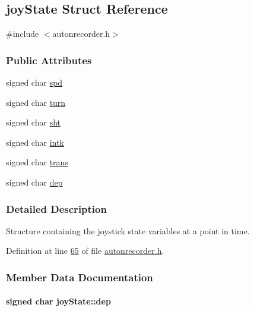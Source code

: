 \hypertarget{structjoy_state}{}\subsection{joy\+State Struct Reference}
\label{structjoy_state}


{\ttfamily \#include $<$autonrecorder.\+h$>$}

\subsubsection*{Public Attributes}
\begin{DoxyCompactItemize}
\item 
signed char \hyperlink{structjoy_state_a7867156ddb5bc22d57010c5af00c98af}{spd}
\item 
signed char \hyperlink{structjoy_state_aacdbb758b97190220423402f63020483}{turn}
\item 
signed char \hyperlink{structjoy_state_a751363be4e40b27bcbe558f41a15fe91}{sht}
\item 
signed char \hyperlink{structjoy_state_a2314ed43be31ccc565381efd8398b921}{intk}
\item 
signed char \hyperlink{structjoy_state_acc4f7bae078e8c8b7840cda61382c7cf}{trans}
\item 
signed char \hyperlink{structjoy_state_a3ba5ee3c4eec0e2ee03338b397a17958}{dep}
\end{DoxyCompactItemize}


\subsubsection{Detailed Description}
Structure containing the joystick state variables at a point in time. 

Definition at line \hyperlink{autonrecorder_8h_source_l00065}{65} of file \hyperlink{autonrecorder_8h_source}{autonrecorder.\+h}.



\subsubsection{Member Data Documentation}
\paragraph[{\texorpdfstring{dep}{dep}}]{\setlength{\rightskip}{0pt plus 5cm}signed char joy\+State\+::dep}\hypertarget{structjoy_state_a3ba5ee3c4eec0e2ee03338b397a17958}{}\label{structjoy_state_a3ba5ee3c4eec0e2ee03338b397a17958}


